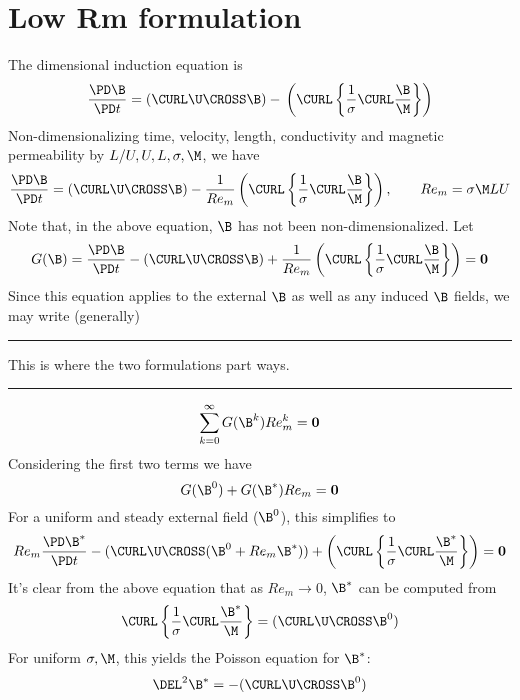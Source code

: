 \documentclass[11pt]{article}
\begin{document}
\doublespacing
\MOONSTITLE

\section{Low Rm formulation}
The dimensional induction equation is
\begin{equation}
  \frac{\PD \B}{\PD t}
  =
  (\CURL \U \CROSS \B)
  - \\
  \left(
  \CURL
  \left\{
  \frac{1}{\sigma}
  \CURL
  \frac{\B}{\M}
  \right\}
  \right)
\end{equation}
Non-dimensionalizing time, velocity, length, conductivity and magnetic permeability by $L/U,U,L,\sigma,\M$, we have
\begin{equation}
  \frac{\PD \B}{\PD t}
  =
  (\CURL \U \CROSS \B)
  - \\
  \frac{1}{Re_m}
  \left(
  \CURL
  \left\{
  \frac{1}{\sigma}
  \CURL
  \frac{\B}{\M}
  \right\}
  \right)
  ,\qquad Re_m = \sigma \M LU
\end{equation}
Note that, in the above equation, $\B$ has not been non-dimensionalized. Let
\begin{equation}
  G(\B)
  =
  \frac{\PD \B}{\PD t}
  -
  (\CURL \U \CROSS \B)
  +
  \frac{1}{Re_m}
  \left(
  \CURL
  \left\{
  \frac{1}{\sigma}
  \CURL
  \frac{\B}{\M}
  \right\}
  \right)
  =
  \mathbf{0}
\end{equation}
Since this equation applies to the external $\B$ as well as any induced $\B$ fields, we may write (generally)

\noindent
\rule{\textwidth}{1pt}
\begin{center}
This is where the two formulations part ways.
\end{center}
\noindent
\rule{\textwidth}{1pt}
\begin{equation}
	\sum_{k=0}^{\infty} G(\B^k)
  Re_m^k
	=
	\mathbf{0}
\end{equation}
Considering the first two terms we have
\begin{equation}
  G(\B^0)
  +
  G(\B^{*}) Re_m
  =
  \mathbf{0}
\end{equation}
For a uniform and steady external field ($\B^0$), this simplifies to
\begin{equation}
  Re_m \frac{\PD \B^{*}}{\PD t}
  -
  (\CURL \U \CROSS (\B^0 + Re_m \B^*))
  +
  \left(
  \CURL
  \left\{
  \frac{1}{\sigma}
  \CURL
  \frac{\B^{*}}{\M}
  \right\}
  \right)
  =
  \mathbf{0}
\end{equation}
It's clear from the above equation that as $Re_m \rightarrow 0$, $\B^*$ can be computed from
\begin{equation}
  \CURL
  \left\{
  \frac{1}{\sigma}
  \CURL
  \frac{\B^{*}}{\M}
  \right\}
  =
  (\CURL \U \CROSS \B^0)
\end{equation}
For uniform $\sigma, \M$, this yields the Poisson equation for $\B^*$:
\begin{equation}
  \DEL^2 \B^{*}
  =
  -
  (\CURL \U \CROSS \B^0)
\end{equation}
\end{document}
